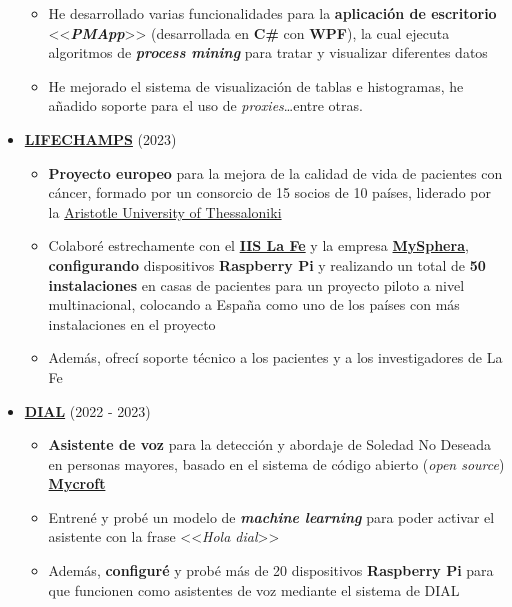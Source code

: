 \documentclass[letterpaper, 12pt, dvipsnames]{article}
\begin{document}
\begin{itemize}
          \begin{itemize}
              \item He desarrollado varias funcionalidades para la \textbf{aplicación de escritorio} <<\textbf{\emph{PMApp}}>> (desarrollada en \textbf{C\#} con \textbf{WPF}), la cual ejecuta algoritmos de \textbf{\emph{process mining}} para tratar y visualizar diferentes datos
              \item He mejorado el sistema de visualización de tablas e histogramas, he añadido soporte para el uso de \emph{proxies}\dots entre otras.
          \end{itemize}
    \item {\large\textbf{\href{https://lifechamps.eu/}{LIFECHAMPS}}} (2023)
        \begin{itemize}
            \item \textbf{Proyecto europeo} para la mejora de la calidad de vida de pacientes con cáncer, formado por un consorcio de 15 socios de 10 países, liderado por la \href{https://www.auth.gr/en/}{Aristotle University of Thessaloniki}
            \item Colaboré estrechamente con el \textbf{\href{https://www.iislafe.es/es/}{IIS La Fe}} y la empresa \textbf{\href{https://www.mysphera.com/es/}{MySphera}}, \textbf{configurando} dispositivos \textbf{Raspberry Pi} y realizando un total de \textbf{50 instalaciones} en casas de pacientes para un proyecto piloto a nivel multinacional, colocando a España como uno de los países con más instalaciones en el proyecto
            \item Además, ofrecí soporte técnico a los pacientes y a los investigadores de La Fe
        \end{itemize}
    \item {\large\textbf{\href{http://www.sabien.upv.es/project/dial/}{DIAL}}} (2022 - 2023)
          \begin{itemize}
              \item \textbf{Asistente de voz} para la detección y abordaje de Soledad No Deseada en personas mayores, basado en el sistema de código abierto (\emph{open source}) \textbf{\href{https://mycroft.ai/}{Mycroft}}
              \item Entrené y probé un modelo de \textbf{\emph{machine learning}} para poder activar el asistente con la frase <<\emph{Hola dial}>>
              \item Además, \textbf{configuré} y probé más de 20 dispositivos \textbf{Raspberry Pi} para que funcionen como asistentes de voz mediante el sistema de DIAL

\end{itemize}
\end{itemize}
\end{document}
